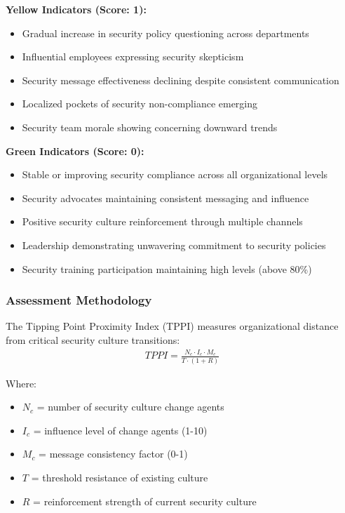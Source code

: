 \documentclass[11pt,a4paper]{article}
\begin{document}
\textbf{Yellow Indicators (Score: 1):}
\begin{itemize}
\item Gradual increase in security policy questioning across departments
\item Influential employees expressing security skepticism
\item Security message effectiveness declining despite consistent communication
\item Localized pockets of security non-compliance emerging
\item Security team morale showing concerning downward trends
\end{itemize}

\textbf{Green Indicators (Score: 0):}
\begin{itemize}
\item Stable or improving security compliance across all organizational levels
\item Security advocates maintaining consistent messaging and influence
\item Positive security culture reinforcement through multiple channels
\item Leadership demonstrating unwavering commitment to security policies
\item Security training participation maintaining high levels (above 80\%)
\end{itemize}

\subsubsection{Assessment Methodology}

The Tipping Point Proximity Index (TPPI) measures organizational distance from critical security culture transitions:
\begin{align}
TPPI = \frac{N_c \cdot I_c \cdot M_c}{T \cdot (1 + R)}
\end{align}

Where:
\begin{itemize}
\item $N_c$ = number of security culture change agents
\item $I_c$ = influence level of change agents (1-10)
\item $M_c$ = message consistency factor (0-1)
\item $T$ = threshold resistance of existing culture
\item $R$ = reinforcement strength of current security culture
\end{itemize}
\end{document}
